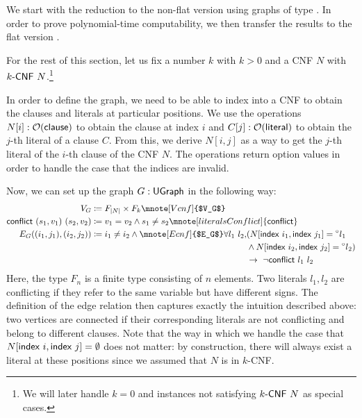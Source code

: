 We start with the reduction to the non-flat version \Clique{} using graphs of type \UGraph{}. In order to prove polynomial-time computability, we then transfer the results to the flat version \FlatClique{}. 

For the rest of this section, let us fix a number $k$ with $k > 0$ and a CNF $N$ with $\text{$k$-\textsf{CNF}}~N$.\footnote{We will later handle $k = 0$ and instances not satisfying $\text{$k$-\textsf{CNF}}~N$ as special cases.}

In order to define the graph, we need to be able to index into a CNF to obtain the clauses and literals at particular positions. 
We use the operations $N[i] : \mathcal{O}{(\textsf{clause})}$ to obtain the clause at index $i$ and $C[j] : \mathcal{O}{(\textsf{literal})}$ to obtain the $j$-th literal of a clause $C$.
From this, we derive $N[i, j]$ as a way to get the $j$-th literal of the $i$-th clause of the CNF $N$. The operations return option values in order to handle the case that the indices are invalid.

\newcommand{\literalsConflict}{\textsf{conflict}}
Now, we can set up the graph $G : \textsf{UGraph}$ in the following way: 
\begin{align*} 
  V_G &\defeq F_{\length{N}} \times F_{k}\mnote[Vcnf]{$V_G$} \\
  \literalsConflict~(s_1, v_1)~(s_2, v_2) &\defeq v_1 = v_2 \land s_1 \neq s_2\mnote[literalsConflict]{\literalsConflict}\\
  E_G ((i_1, j_1), (i_2, j_2)) &\defeq i_1 \neq i_2 \land \mnote[Ecnf]{$E_G$}
  \begin{aligned}[t]
    \forall l_1~l_2, &(N[\findex{i_1}, \findex{j_1}] = \OSome{l_1} \\
                     &\land N[\findex{i_2}, \findex{j_2}] = \OSome{l_2}) \\
                     &\rightarrow~\lnot \literalsConflict~l_1~l_2 
  \end{aligned}
\end{align*}
Here, the type $F_n$ is a finite type consisting of $n$ elements. Two literals $l_1, l_2$ are conflicting if they refer to the same variable but have different signs. 
The definition of the edge relation then captures exactly the intuition described above: two vertices are connected if their corresponding literals are not conflicting and belong to different clauses. 
Note that the way in which we handle the case that $N[\textsf{index}~i, \textsf{index}~j] = \emptyset$ does not matter: by construction, there will always exist a literal at these positions since we assumed that $N$ is in $k$-CNF.

